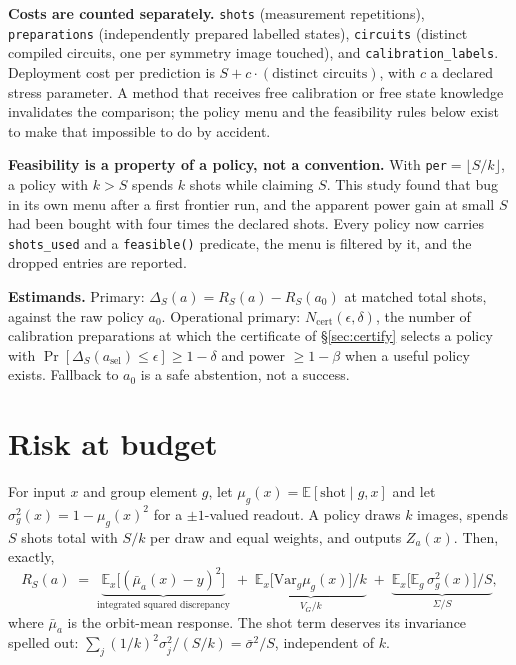 \documentclass{article}
\newcommand{\risk}{R}
\begin{document}
\textbf{Costs are counted separately.} \texttt{shots} (measurement repetitions),
\texttt{preparations} (independently prepared labelled states), \texttt{circuits} (distinct compiled
circuits, one per symmetry image touched), and \texttt{calibration\_labels}. Deployment cost per
prediction is $S + c\cdot(\text{distinct circuits})$, with $c$ a declared stress parameter. A method
that receives free calibration or free state knowledge invalidates the comparison; the policy menu
and the feasibility rules below exist to make that impossible to do by accident.

\textbf{Feasibility is a property of a policy, not a convention.} With \texttt{per}$=\lfloor S/k\rfloor$,
a policy with $k>S$ spends $k$ shots while claiming $S$. This study found that bug in its own menu
after a first frontier run, and the apparent power gain at small $S$ had been bought with four times
the declared shots. Every policy now carries \texttt{shots\_used} and a \texttt{feasible()} predicate,
the menu is filtered by it, and the dropped entries are reported.

\textbf{Estimands.} Primary: $\Delta_S(a)=\risk_S(a)-\risk_S(a_0)$ at matched total shots, against the
raw policy $a_0$. Operational primary: $N_{\mathrm{cert}}(\epsilon,\delta)$, the number of calibration
preparations at which the certificate of \S\ref{sec:certify} selects a policy with
$\Pr[\Delta_S(a_{\mathrm{sel}})\le\epsilon]\ge 1-\delta$ and power $\ge 1-\beta$ when a useful policy
exists. Fallback to $a_0$ is a safe abstention, not a success.

\section{Risk at budget}
\label{sec:risk}

For input $x$ and group element $g$, let $\mu_g(x)=\mathbb{E}[\text{shot}\mid g,x]$ and let
$\sigma_g^2(x)=1-\mu_g(x)^2$ for a $\pm1$-valued readout. A policy draws $k$ images, spends $S$
shots total with $S/k$ per draw and equal weights, and outputs $Z_a(x)$. Then, exactly,
\begin{equation}
\risk_S(a)\;=\;\underbrace{\mathbb{E}_x\big[(\bar\mu_a(x)-y)^2\big]}_{\text{integrated squared discrepancy}}
\;+\;\underbrace{\mathbb{E}_x\big[\mathrm{Var}_{g}\mu_g(x)\big]/k}_{V_G/k}
\;+\;\underbrace{\mathbb{E}_x\big[\mathbb{E}_g\,\sigma_g^2(x)\big]/S}_{\Sigma/S},
\label{eq:decomp}
\end{equation}
where $\bar\mu_a$ is the orbit-mean response. The shot term deserves its invariance spelled out:
$\sum_j (1/k)^2\sigma_j^2/(S/k)=\bar\sigma^2/S$, independent of $k$.
\end{document}
